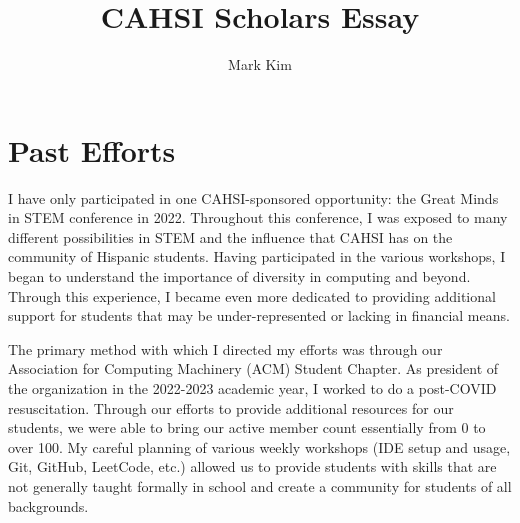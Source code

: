 \documentclass[12pt]{article}
\title{CAHSI Scholars Essay}
\author{Mark Kim}
\begin{document}
\maketitle



\section*{Past Efforts}

I have only participated in one CAHSI-sponsored opportunity: the Great Minds in
STEM conference in 2022.  Throughout this conference, I was exposed to many
different possibilities in STEM and the influence that CAHSI has on the
community of Hispanic students.  Having participated in the various workshops, I
began to understand the importance of diversity in computing and beyond.
Through this experience, I became even more dedicated to providing additional
support for students that may be under-represented or lacking in financial
means.

The primary method with which I directed my efforts was through our Association
for Computing Machinery (ACM) Student Chapter.  As president of the organization in
the 2022-2023 academic year, I worked to do a post-COVID resuscitation.  Through
our efforts to provide additional resources for our students, we were able to
bring our active member count essentially from 0 to over 100.  My careful
planning of various weekly workshops (IDE setup and usage, Git, GitHub,
LeetCode, etc.) allowed us to provide students with skills that are not
generally taught formally in school and create a community for students of all
backgrounds.
\end{document}
